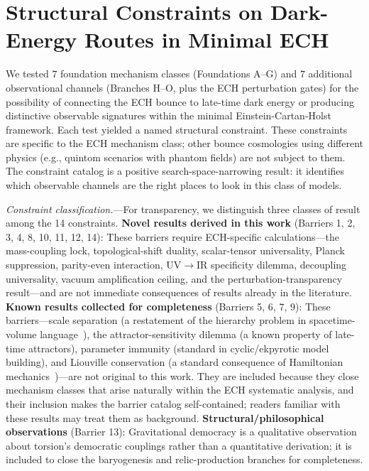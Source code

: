 \documentclass[aps,prd,twocolumn,superscriptaddress,showpacs,preprintnumbers,nofootinbib,longbibliography,floatfix]{revtex4-2}
\begin{document}
\section{Structural Constraints on Dark-Energy Routes in Minimal ECH}\label{sec:barriers}

We tested 7 foundation mechanism classes (Foundations A--G) and 7 additional observational channels (Branches H--O, plus the ECH perturbation gates) for the possibility of connecting the ECH bounce to late-time dark energy or producing distinctive observable signatures within the minimal Einstein-Cartan-Holst framework. Each test yielded a named structural constraint. These constraints are specific to the ECH mechanism class; other bounce cosmologies using different physics (e.g., quintom scenarios with phantom fields) are not subject to them. The constraint catalog is a positive search-space-narrowing result: it identifies which observable channels are the right places to look in this class of models.

\textit{Constraint classification.}---For transparency, we distinguish three classes of result among the 14 constraints. \textbf{Novel results derived in this work} (Barriers 1, 2, 3, 4, 8, 10, 11, 12, 14): These barriers require ECH-specific calculations---the mass-coupling lock, topological-shift duality, scalar-tensor universality, Planck suppression, parity-even interaction, UV$\to$IR specificity dilemma, decoupling universality, vacuum amplification ceiling, and the perturbation-transparency result---and are not immediate consequences of results already in the literature. \textbf{Known results collected for completeness} (Barriers 5, 6, 7, 9): These barriers---scale separation (a restatement of the hierarchy problem in spacetime-volume language~\cite{Weinberg1989}), the attractor-sensitivity dilemma (a known property of late-time attractors), parameter immunity (standard in cyclic/ekpyrotic model building), and Liouville conservation (a standard consequence of Hamiltonian mechanics~\cite{Penrose1979})---are not original to this work. They are included because they close mechanism classes that arise naturally within the ECH systematic analysis, and their inclusion makes the barrier catalog self-contained; readers familiar with these results may treat them as background. \textbf{Structural/philosophical observations} (Barrier 13): Gravitational democracy is a qualitative observation about torsion's democratic couplings rather than a quantitative derivation; it is included to close the baryogenesis and relic-production branches for completeness.
\end{document}
